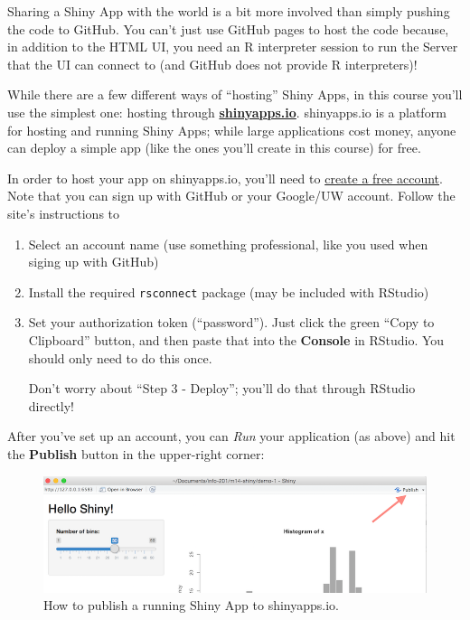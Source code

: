 \documentclass[]{book}
\theoremstyle{definition}
\theoremstyle{definition}
\theoremstyle{remark}
\begin{document}
Sharing a Shiny App with the world is a bit more involved than simply
pushing the code to GitHub. You can't just use GitHub pages to host the
code because, in addition to the HTML UI, you need an R interpreter
session to run the Server that the UI can connect to (and GitHub does
not provide R interpreters)!

While there are a few different ways of ``hosting'' Shiny Apps, in this
course you'll use the simplest one: hosting through
\href{https://www.shinyapps.io}{\textbf{shinyapps.io}}. shinyapps.io is
a platform for hosting and running Shiny Apps; while large applications
cost money, anyone can deploy a simple app (like the ones you'll create
in this course) for free.

In order to host your app on shinyapps.io, you'll need to
\href{https://www.shinyapps.io/admin/\#/signup}{create a free account}.
Note that you can sign up with GitHub or your Google/UW account. Follow
the site's instructions to

\begin{enumerate}
\def\labelenumi{\arabic{enumi}.}
\item
  Select an account name (use something professional, like you used when
  siging up with GitHub)
\item
  Install the required \texttt{rsconnect} package (may be included with
  RStudio)
\item
  Set your authorization token (``password''). Just click the green
  ``Copy to Clipboard'' button, and then paste that into the
  \textbf{Console} in RStudio. You should only need to do this once.

  Don't worry about ``Step 3 - Deploy''; you'll do that through RStudio
  directly!
\end{enumerate}

After you've set up an account, you can \emph{Run} your application (as
above) and hit the \textbf{Publish} button in the upper-right corner:

\begin{figure}
\centering
\includegraphics{img/shiny/publish-app.png}
\caption{How to publish a running Shiny App to shinyapps.io.}
\end{figure}
\end{document}
